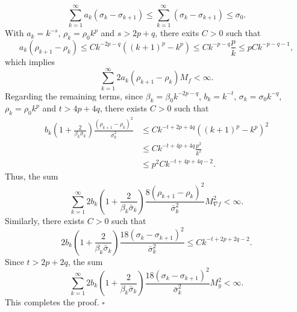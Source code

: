 \documentclass{article}
\newenvironment{proof}[1][Proof]{\par
	\normalfont\topsep6pt\relax
	\trivlist\item[\hskip\labelsep\itshape #1.]\ignorespaces
}{%
	\hfill\ensuremath{\square}\endtrivlist
}
\begin{document}
\begin{proof}[Proof of Proposition \ref{prop4.1}
      ]
  \[
   \sum_{k=1}^{\infty} a_k\left( \sigma_k - \sigma_{k+1} \right) \le \sum_{k=1}^{\infty}\left( \sigma_k - \sigma_{k+1} \right) \le \sigma_0.
  \]
  With $a_k = k^{-s}$, $\rho_k = \rho_0 k^p$ and $s > 2p+q$, there exits $C > 0$ such that
  \[
a_k\left(\rho_{k+1} - \rho_k\right) \le Ck^{-2p-q} ((k+1)^p - k^p)\le C k^{-p-q} \frac{p}{k} \le p C k^{-p-q-1} ,
  \]
  which implies
  \[
  \sum_{k=1}^{\infty} 2a_k\left(\rho_{k+1} - \rho_k\right)M_f < \infty.
  \]
  Regarding the remaining terms, since $\beta_k = \beta_0 k^{-2p-q}$, $b_k = k^{-t}$, $\sigma_k = \sigma_0 k^{-q}$, $\rho_k = \rho_0 k^p$ and $t > 4p + 4q$, there exists $C>0$ such that
      \begin{align*}
          b_k(1+\frac{2}{\beta_k\bar{\sigma}_k}) \frac{ (\rho_{k+1} - \rho_k)^2}{\bar{\sigma}_k^2} &\le C k^{-t+2p+4q} ((k+1)^p - k^p)^2 \\& \le C k^{-t+4p+4q} \frac{p^2}{k^2} \\
        &\le p^2 C k^{-t+4p+4q-2}.
      \end{align*}
      Thus, the sum
      \[
      \sum_{k=1}^{\infty} 2b_k(1+\frac{2}{\beta_k\bar{\sigma}_k})\frac{8(\rho_{k+1} - \rho_k)^2}{\bar{\sigma}_k^2}M_{\nabla f}^2 < \infty.
      \]
      Similarly, there exists $C>0$ such that
      \[
      2b_k(1+\frac{2}{\beta_k\bar{\sigma}_k}) \frac{18(\sigma_{k} - \sigma_{k+1})^2}{\bar{\sigma}_k^2} \le Ck^{-t+2p+2q-2}.
      \]
      Since $t > 2p+2q$, the sum
      \[
      \sum_{k=1}^{\infty}2b_k(1+\frac{2}{\beta_k\bar{\sigma}_k}) \frac{18(\sigma_{k} - \sigma_{k+1})^2}{\bar{\sigma}_k^2}M_y^2 < \infty.
      \]
      This completes the proof.
	 \end{proof}
\end{document}
